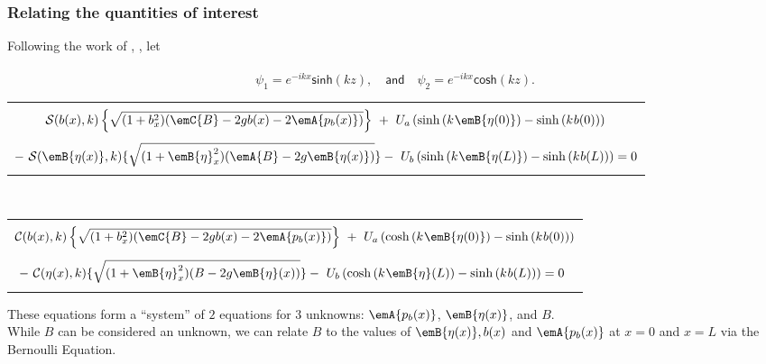 \begin{frame}[t]
	\end{frame}


\begin{frame}[t]
	\frametitle{Relating the quantities of interest}
		Following the work of , , let \\~\\
		\pause
		$$\psi_1 = e^{-ikx}\textsf{sinh}(kz), \quad \textsf{and}\quad \psi_2 = e^{-ikx}\textsf{cosh}(kz).$$
		\vfill
		\pause
		
		\begin{center}
	 	\begin{tabular}{!{\color{blue}\vrule}c!{\color{blue}\vrule}}
		\hline
		\\
		$\displaystyle \mathcal{S}(b(x),k)\left\lbrace\sqrt{(1 + b_x^2)(\emC{B} - 2 g b(x) - 2\emA{p_b(x)})}\right\rbrace~ + ~U_a\left(\sinh\left(k\:\!\emB{\eta(0)}\right) - \sinh\left(k\:\!b(0)\right)\right)$\\ \\
		$\displaystyle - ~\mathcal{S}(\emB{\eta(x)},k)\lbrace\sqrt{(1 + \emB{\eta}_x^2)(\emA{B} - 2 g \emB{\eta(x)})}\rbrace -  ~U_b\left(\sinh\left(k\:\!\emB{\eta(L)}\right) - \sinh\left(k\:\!b(L)\right)\right) = 0$\\ \\
		\hline
		\end{tabular}~\\

		\vfill

		
	 	\begin{tabular}{!{\color{blue}\vrule}c!{\color{blue}\vrule}}
		\hline
		\\
		$\displaystyle \mathcal{C}(b(x),k)\left\lbrace\sqrt{(1 + b_x^2)(\emC{B} - 2 g b(x) - 2\emA{p_b(x)})}\right\rbrace~ + ~U_a\left(\cosh\left(k\:\!\emB{\eta(0)}\right) - \sinh\left(k\:\!b(0)\right)\right)$ \\ \\
		$\displaystyle - ~\mathcal{C}(\eta(x),k)\lbrace\sqrt{(1 + \emB{\eta}_x^2)(B - 2 g \emB{\eta}(x))}\rbrace -  ~U_b\left(\cosh\left(k\:\!\emB{\eta}(L)\right) - \sinh\left(k\:\!b(L)\right)\right) = 0$~\\ \\
		\hline
		\end{tabular}
		\end{center}
		\vfill
		\pause
		These equations form a ``system'' of $2$ equations for $3$ unknowns: $\emA{p_b(x)}$, $\emB{\eta(x)}$, and $B$.\\
		\pause While $B$ can be considered an unknown, we can relate $B$ to the values of $\emB{\eta(x)}, b(x)$ and $\emA{p_b(x)}$ at $x = 0$ and $x = L$ via the Bernoulli Equation.
		


	\end{frame}
